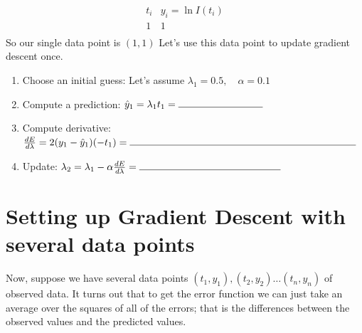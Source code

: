 \documentclass[11pt]{article}
\begin{document}
\[
\begin{array}{c|c}
t_i & y_i = \ln I(t_i) \\
\hline
1 & 1 \\
\end{array}
\]
So our single data point is $(1,1)$ Let's use this data point to update gradient descent once.
\begin{enumerate}
\item[(a)] Choose an initial guess:
Let's assume
$\lambda_1 = 0.5, \quad \alpha = 0.1$\\
\vspace{3cm}

\item[(b)] Compute a prediction:
$
\hat{y}_1 = \lambda_1 t_1 = \rule{3cm}{0.4pt}
$\\
\vspace{3cm}

\item[(c)] Compute derivative:
\(
\frac{dE}{d\lambda} = 2(y_1 - \hat{y}_1)(-t_1)
= \rule{8cm}{0.4pt}
\)\\
\vspace{3cm}

\item[(d)] Update:
$
\lambda_2 = \lambda_1 - \alpha \frac{dE}{d\lambda}
= \rule{5cm}{0.4pt}
$\\
\vspace{3cm}

\end{enumerate}
\newpage
\section*{Setting up Gradient Descent with several data points}
Now, suppose we have several data points $(t_1,y_1), (t_2,y_2) \ldots (t_{n},y_{n})$ of observed data.
It turns out that to get the error function we can just take an average over the squares of all of the errors; that is the differences between the observed values and the predicted values.
\vspace{1cm}
\end{document}
